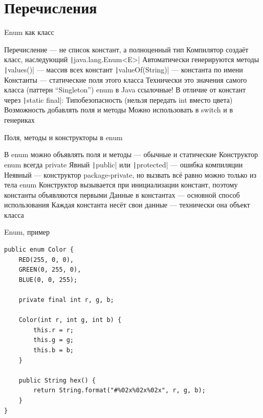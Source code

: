 \documentclass{../../slides-style}
\begin{document}
    \section{Перечисления}

    \begin{frame}{Enum как класс}
        \begin{outline}
            \1 Перечисление --- не список констант, а полноценный тип
            \1 Компилятор создаёт класс, наследующий \texttt|java.lang.Enum<E>|
            \1 Автоматически генерируются методы
                \2 \texttt|values()| --- массив всех констант
                \2 \texttt|valueOf(String)| --- константа по имени
            \1 Константы --- статические поля этого класса
                \2 Технически это значения самого класса (паттерн \enquote{Singleton})
                \2 enum в Java ссылочные!
            \1 В отличие от констант через \texttt|static final|:
                \2 Типобезопасность (нельзя передать int вместо цвета)
                \2 Возможность добавлять поля и методы
                \2 Можно использовать в switch и в генериках
        \end{outline}
    \end{frame}

    \begin{frame}{Поля, методы и конструкторы в enum}
        \begin{outline}
            \1 В enum можно объявлять поля и методы --- обычные и статические
            \1 Конструктор enum всегда private
                \2 Явный \texttt|public| или \texttt|protected| --- ошибка компиляции
                \2 Неявный --- конструктор package-private, но вызвать всё равно можно только из тела enum
            \1 Конструктор вызывается при инициализации констант, поэтому константы объявляются первыми
            \1 Данные в константах --- основной способ использования
                \2 Каждая константа несёт свои данные --- технически она объект класса
        \end{outline}
    \end{frame}

    \begin{frame}[fragile]{Enum, пример}
        \begin{small}
            \begin{verbatim}
public enum Color {
    RED(255, 0, 0),
    GREEN(0, 255, 0),
    BLUE(0, 0, 255);

    private final int r, g, b;

    Color(int r, int g, int b) {
        this.r = r;
        this.g = g;
        this.b = b;
    }

    public String hex() {
        return String.format("#%02x%02x%02x", r, g, b);
    }
}
            \end{verbatim}
        \end{small}
    \end{frame}
\end{document}
